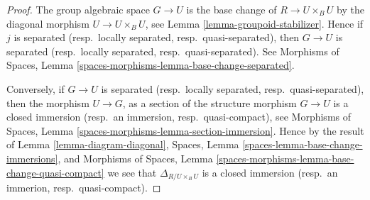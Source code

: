 \begin{proof}
The group algebraic space $G \to U$ is the base change of $R \to U \times_B U$
by the diagonal morphism $U \to U \times_B U$, see
Lemma \ref{lemma-groupoid-stabilizer}. Hence if
$j$ is separated (resp.\ locally separated, resp.\ quasi-separated),
then $G \to U$ is separated (resp.\ locally separated, resp.\ quasi-separated).
See
Morphisms of Spaces, Lemma
\ref{spaces-morphisms-lemma-base-change-separated}.

\medskip\noindent
Conversely, if $G \to U$ is separated
(resp.\ locally separated, resp.\ quasi-separated), then the morphism
$U \to G$, as a section of the structure morphism $G \to U$ is a closed
immersion (resp.\ an immersion, resp.\ quasi-compact), see
Morphisms of Spaces, Lemma \ref{spaces-morphisms-lemma-section-immersion}.
Hence by the result of
Lemma \ref{lemma-diagram-diagonal},
Spaces, Lemma \ref{spaces-lemma-base-change-immersions}, and
Morphisms of Spaces,
Lemma \ref{spaces-morphisms-lemma-base-change-quasi-compact}
we see that $\Delta_{R/U \times_B U}$ is a closed
immersion (resp.\ an immerion, resp.\ quasi-compact).
\end{proof}





















